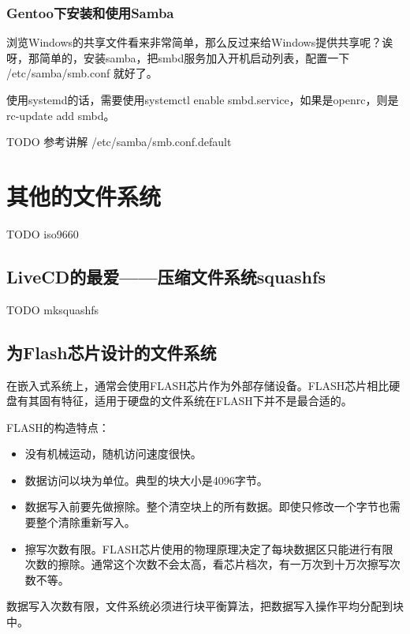 \subsubsection{Gentoo下安装和使用Samba}

浏览Windows的共享文件看来非常简单，那么反过来给Windows提供共享呢？诶呀，那简单的，安装samba，把smbd服务加入开机启动列表，配置一下 /etc/samba/smb.conf 就好了。

使用systemd的话，需要使用systemctl enable smbd.service，如果是openrc，则是 rc-update add smbd。

TODO
参考讲解
/etc/samba/smb.conf.default

\section{其他的文件系统}

TODO iso9660 


\subsection{LiveCD的最爱——压缩文件系统squashfs}

TODO mksquashfs 



\subsection{为Flash芯片设计的文件系统}

在嵌入式系统上，通常会使用FLASH芯片作为外部存储设备。FLASH芯片相比硬盘有其固有特征，适用于硬盘的文件系统在FLASH下并不是最合适的。

FLASH的构造特点：


\begin{itemize}
\item 没有机械运动，随机访问速度很快。
\item 数据访问以块为单位。典型的块大小是4096字节。
\item 数据写入前要先做擦除。整个清空块上的所有数据。即使只修改一个字节也需要整个清除重新写入。
\item 擦写次数有限。FLASH芯片使用的物理原理决定了每块数据区只能进行有限次数的擦除。通常这个次数不会太高，看芯片档次，有一万次到十万次擦写次数不等。
\end{itemize}

数据写入次数有限，文件系统必须进行块平衡算法，把数据写入操作平均分配到块中。
